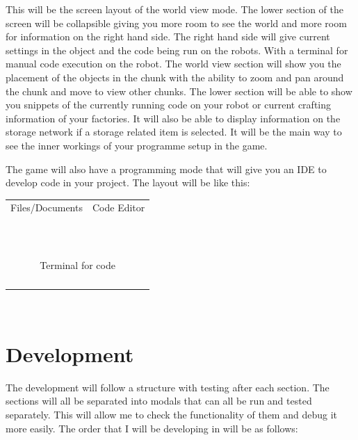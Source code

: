 \documentclass[12pt]{article}
\begin{document}
This will be the screen layout of the world view mode. The lower section of the screen will be collapsible giving you more room to see the world and more room for information on the right hand side.
The right hand side will give current settings in the object and the code being run on the robots. With a terminal for manual code execution on the robot.
The world view section will show you the placement of the objects in the chunk with the ability to zoom and pan around the chunk and move to view other chunks.
The lower section will be able to show you snippets of the currently running code on your robot or current crafting information of your factories. It will also be able to display information on the storage network if a storage related item is selected. It will be the main way to see the inner workings of your programme setup in the game.

The game will also have a programming mode that will give you an IDE to develop code in your project.
The layout will be like this:


\begin{tabular}{| l | l |}
\hline
Files/Documents & Code Editor\hspace*{9.5cm}\\
&\\
&\\
&\\
&\\
&\\
&\\
&\\
&\\
&\\
&\\
&\\
\hline
\multicolumn{2}{|c|}{Terminal for code} \\
\multicolumn{2}{|c|}{} \\
\multicolumn{2}{|c|}{} \\
\multicolumn{2}{|c|}{} \\
\multicolumn{2}{|c|}{} \\
\hline
\end{tabular}\\

\newpage
\section{Development}
The development will follow a structure with testing after each section. The sections will all be separated into modals that can all be run and tested separately. This will allow me to check the functionality of them and debug it more easily. The order that I will be developing in will be as follows:
\end{document}
